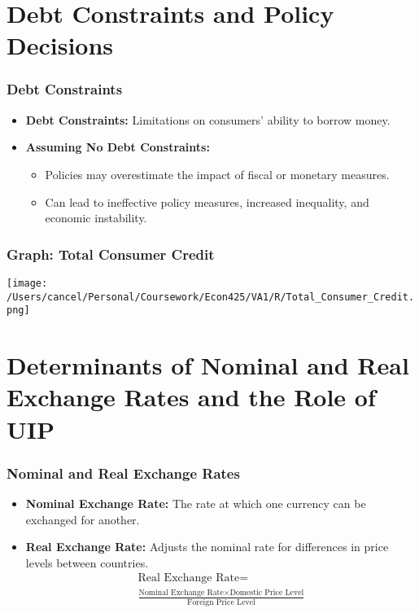\documentclass{beamer}
\begin{document}
\section{Debt Constraints and Policy Decisions}
\begin{frame}
    \frametitle{Debt Constraints}
    \begin{itemize}
        \item \textbf{Debt Constraints:} Limitations on consumers' ability to borrow money.
        \item \textbf{Assuming No Debt Constraints:}
        \begin{itemize}
            \item Policies may overestimate the impact of fiscal or monetary measures.
            \item Can lead to ineffective policy measures, increased inequality, and economic instability.
        \end{itemize}
    \end{itemize}
\end{frame}

\begin{frame}
    \frametitle{Graph: Total Consumer Credit}
    \begin{center}
        \texttt{[image: /Users/cancel/Personal/Coursework/Econ425/VA1/R/Total\_Consumer\_Credit.png]}
    \end{center}
\end{frame}

\section{Determinants of Nominal and Real Exchange Rates and the Role of UIP}
\begin{frame}
    \frametitle{Nominal and Real Exchange Rates}
    \begin{itemize}
        \item \textbf{Nominal Exchange Rate:} The rate at which one currency can be exchanged for another.
        \item \textbf{Real Exchange Rate:} Adjusts the nominal rate for differences in price levels between countries.
        \begin{gather*}
                \text{Real Exchange Rate} = \\
                \frac{\text{Nominal Exchange Rate} \times \text{Domestic Price Level}}{\text{Foreign Price Level}}
        \end{gather*}
    \end{itemize}
\end{frame}
\end{document}
